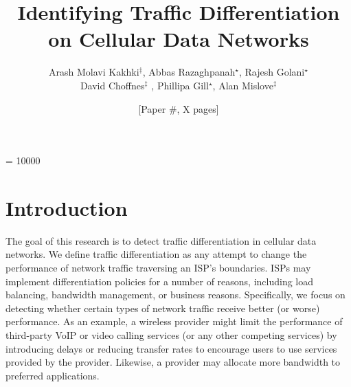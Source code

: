 \documentclass[letterpaper]{sig-alternate-2013}
\title{Identifying Traffic Differentiation on Cellular Data Networks}
\author{
	\alignauthor Arash Molavi Kakhki$^\ddagger$, Abbas Razaghpanah$^\star$, Rajesh Golani$^\star$\\David Choffnes$^\ddagger$ , Phillipa Gill$^\star$, Alan Mislove$^\ddagger$ \\
	\affaddr{$^\ddagger$Northeastern University, $^\star$Stony Brook University}
}
\author{[Paper \#, X pages]}
\begin{document}

\widowpenalty = 10000

\maketitle

\section{Introduction}


The goal of this research is to detect traffic differentiation in cellular data networks. We define traffic differentiation as any attempt to change the performance of network traffic traversing an ISP's boundaries. ISPs may implement differentiation policies for a number of reasons, including load balancing, bandwidth management, or business reasons. Specifically, we focus on detecting whether certain types of network traffic receive better (or worse) performance. As an example, a wireless provider might limit the performance of third-party VoIP or video calling services (or any other competing services) by introducing delays or reducing transfer rates to encourage users to use services provided by the provider. Likewise, a provider may allocate more bandwidth to preferred applications.
\end{document}
